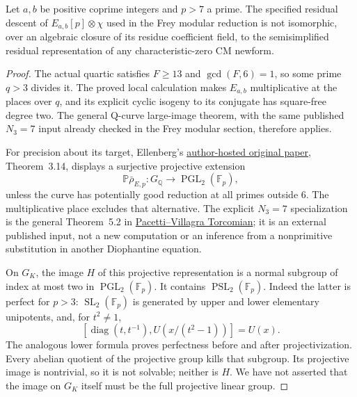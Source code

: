 \begin{theorem}\label{cb-cm-exclusion}
Let $a,b$ be positive coprime integers and $p>7$ a prime. The specified
residual descent of $E_{a,b}[p]\otimes\chi$ used in the Frey modular
reduction is not isomorphic, over an algebraic closure of its residue
coefficient field, to the semisimplified residual representation of
any characteristic-zero CM newform.
\end{theorem}
\begin{proof}
The actual quartic satisfies $F\ge13$ and $\gcd(F,6)=1$, so some
prime $q>3$ divides it. The proved local calculation makes $E_{a,b}$
multiplicative at the places over $q$, and its explicit cyclic
isogeny to its conjugate has square-free degree two. The general
Q-curve large-image theorem, with the same published $N_3=7$ input
already checked in the Frey modular section, therefore applies.

For precision about its target, Ellenberg's
\href{https://people.math.wisc.edu/~ellenberg/A4B2Cp.pdf}{author-hosted original paper},
Theorem~3.14, displays a surjective projective extension
\[
 \mathbb P\bar\rho_{E,p}:G_{\mathbb Q}\longrightarrow
       \operatorname{PGL}_2(\mathbb F_p),
\]
unless the curve has potentially good reduction at all primes outside
$6$. The multiplicative place excludes that alternative. The explicit
$N_3=7$ specialization is the general Theorem~5.2 in
\href{https://sweet.ua.pt/apacetti/papers/Q-curves.pdf}{Pacetti--Villagra Torcomian};
it is an external published input, not a new computation or an inference
from a nonprimitive substitution in another Diophantine equation.

On $G_K$, the image $H$ of this projective representation is a normal
subgroup of index at most two in $\operatorname{PGL}_2(\mathbb F_p)$.
It contains $\operatorname{PSL}_2(\mathbb F_p)$. Indeed the latter
is perfect for $p>3$: $\operatorname{SL}_2(\mathbb F_p)$ is generated
by upper and lower elementary unipotents, and, for $t^2\ne1$,
\[
 [\operatorname{diag}(t,t^{-1}), U(x/(t^2-1))]=U(x).
\]
The analogous lower formula proves perfectness before and after
projectivization. Every abelian quotient of the projective group kills
that subgroup. Its projective image is nontrivial, so it is not
solvable; neither is $H$. We have not asserted that the image on
$G_K$ itself must be the full projective linear group.


\end{proof}
